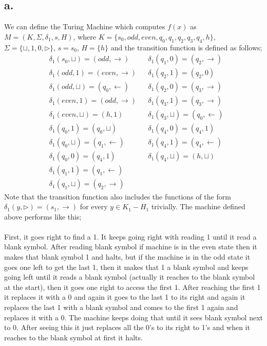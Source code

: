 \documentclass[12pt]{article}
\begin{document}
\subsection*{a.}
We can define the Turing Machine which computes $f(x)$ as $M = (K,\Sigma,\delta_1, s, H)$, where
$K = \{s_0,odd,even,q_0,q_1,q_2,q_3,q_4,h\}$, $\Sigma = \{\sqcup,1,0,\triangleright\}$, $s = s_0$, $H = \{h\}
$ and the transition function is defined as follows;
\begin{align*}
&\delta_1(s_0,\sqcup) = (odd,\rightarrow) &&\delta_1(q_1,0) = (q_2,\rightarrow)\\
&\delta_1(odd,1) = (even,\rightarrow) &&\delta_1(q_2,1) = (q_2,0)\\
&\delta_1(odd,\sqcup) = (q_0,\leftarrow) &&\delta_1(q_2,0) = (q_3,\rightarrow) \\
&\delta_1(even,1) = (odd,\rightarrow) &&\delta_1(q_3,1) = (q_3,\rightarrow)\\
&\delta_1(even,\sqcup) = (h,1) &&\delta_1(q_3,\sqcup) = (q_0,\leftarrow) \\
&\delta_1(q_0,1) = (q_0,\sqcup) &&\delta_1(q_4,0) = (q_4,1) \\
&\delta_1(q_0,\sqcup) = (q_1,\leftarrow) &&\delta_1(q_4,1) = (q_4,\leftarrow)\\
&\delta_1(q_0,0) = (q_4,1) &&\delta_1(q_4,\sqcup) = (h,\sqcup)\\
&\delta_1(q_1,1) = (q_1,\leftarrow) \\
&\delta_1(q_1,\sqcup) = (q_2,\rightarrow)
\end{align*}
Note that the transition function also includes the functions of the form $\delta_1(y,\triangleright) 
= (s_1, \rightarrow)$ for every $y\in K_1-H_1$ trivially.
The machine defined above performs like this;\\\\
First, it goes right to find a 1. It keeps going right with reading 1 until it read a blank symbol. After reading blank symbol if machine is in the even state then it makes that blank symbol 1 and halts, but if the machine is in the odd state it goes one left to get the last 1, then it makes that 1 a blank symbol and keeps going left until it reads a blank symbol (actually it reaches to the blank symbol at the start), then it goes one right to access the first 1. After reaching the first 1 it replaces it with a 0 and again it goes to the last 1 to its right and again it replaces the last 1 with a blank symbol and comes to the first 1 again and replaces it with a 0. The machine keeps doing that until it sees blank symbol next to 0. After seeing this it just replaces all the 0's to its right to 1's and when it reaches to the blank symbol at first it halts.
\end{document}

